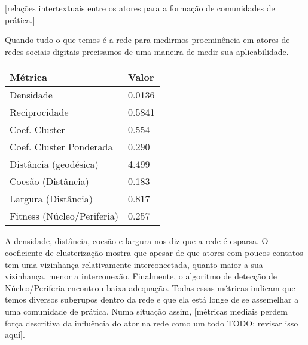 \documentclass{article}
\begin{document}
[relações intertextuais entre os atores para a formação de comunidades de
prática.]

Quando tudo o que temos é a rede para medirmos proeminência em atores de redes
sociais digitais precisamos de uma maneira de medir sua aplicabilidade.


\begin{tabular}{| l | l |}
\hline
Métrica & Valor \\ \hline
Densidade & 0.0136 \\
Reciprocidade & 0.5841 \\
Coef. Cluster & 0.554 \\
Coef. Cluster Ponderada & 0.290 \\
Distância (geodésica) & 4.499 \\
Coesão (Distância) & 0.183 \\
Largura (Distância) & 0.817 \\
Fitness (Núcleo/Periferia) & 0.257 \\
\hline
\end{tabular}

A densidade, distância, coesão e largura nos diz que a rede é esparsa. O
coeficiente de clusterização mostra que apesar de que atores com poucos contatos
tem uma vizinhança relativamente interconectada, quanto maior a sua vizinhança,
menor a interconexão. Finalmente, o algoritmo de detecção de Núcleo/Periferia
encontrou baixa adequação. Todas essas métricas indicam que temos diversos
subgrupos dentro da rede e que ela está longe de se assemelhar a uma comunidade
de prática. Numa situação assim, [métricas mediais perdem força descritiva da
influência do ator na rede como um todo TODO: revisar isso aqui].
\end{document}
